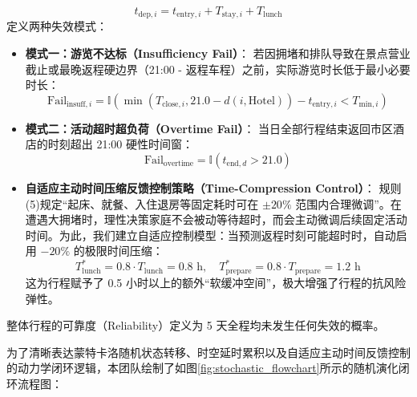 \documentclass{cumcmthesis}
\begin{document}
\begin{equation}
t_{\text{dep}, i} = t_{\text{entry}, i} + T_{\text{stay}, i} + T_{\text{lunch}}
\end{equation}
定义两种失效模式：
\begin{itemize}
\item \textbf{模式一：游览不达标（Insufficiency Fail）}：
若因拥堵和排队导致在景点营业截止或最晚返程硬边界（21:00 - 返程车程）之前，实际游览时长低于最小必要时长：
\begin{equation}
\text{Fail}_{\text{insuff}, i} = \mathbb{I}\left( \min(T_{\text{close}, i}, 21.0 - d(i, \text{Hotel})) - t_{\text{entry}, i} < T_{\text{min}, i} \right)
\end{equation}
\item \textbf{模式二：活动超时超负荷（Overtime Fail）}：
当日全部行程结束返回市区酒店的时刻超出 21:00 硬性时间窗：
\begin{equation}
\text{Fail}_{\text{overtime}} = \mathbb{I}\left( t_{\text{end}, d} > 21.0 \right)
\end{equation}
\item \textbf{自适应主动时间压缩反馈控制策略（Time-Compression Control）}：
规则(5)规定“起床、就餐、入住退房等固定耗时可在 $\pm 20\%$ 范围内合理微调”。在遭遇大拥堵时，理性决策家庭不会被动等待超时，而会主动微调后续固定活动时间。为此，我们建立自适应控制模型：当预测返程时刻可能超时时，自动启用 $-20\%$ 的极限时间压缩：
\begin{equation}
T_{\text{lunch}}^* = 0.8 \cdot T_{\text{lunch}} = 0.8 \text{ h}, \quad T_{\text{prepare}}^* = 0.8 \cdot T_{\text{prepare}} = 1.2 \text{ h}
\end{equation}
这为行程赋予了 0.5 小时以上的额外“软缓冲空间”，极大增强了行程的抗风险弹性。
\end{itemize}
整体行程的可靠度（Reliability）定义为 5 天全程均未发生任何失效的概率。

为了清晰表达蒙特卡洛随机状态转移、时空延时累积以及自适应主动时间反馈控制的动力学闭环逻辑，本团队绘制了如图\ref{fig:stochastic_flowchart}所示的随机演化闭环流程图：
\end{document}
